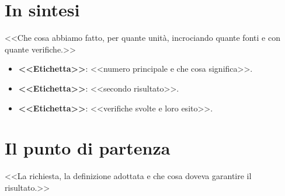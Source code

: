 
\newcommand{\ReportLang}{italian}%
\newcommand{\ReportBrand}{Nomisma}
\newcommand{\ReportProject}{<<PROGETTO>>}%
\newcommand{\ReportTitle}{<<TITOLO: il risultato in una riga, con la scala>>}
\newcommand{\ReportSubtitle}{<<SOTTOTITOLO: Rapporto di sintesi sul lavoro svolto e sui risultati>>}
\newcommand{\ReportAuthor}{<<NOME COGNOME>>}
\newcommand{\ReportRole}{<<RUOLO>>}
\newcommand{\ReportDate}{<<GIORNO MESE ANNO>>}





\maketitleblock

\section{In sintesi}

<<Che cosa abbiamo fatto, per quante unità, incrociando quante fonti e con quante verifiche.>>

\begin{riquadro}
\begin{itemize}
\item \textbf{<<Etichetta>>}: <<numero principale e che cosa significa>>.
\item \textbf{<<Etichetta>>}: <<secondo risultato>>.
\item \textbf{<<Etichetta>>}: <<verifiche svolte e loro esito>>.
\end{itemize}
\end{riquadro}

\tableofcontents

\section{Il punto di partenza}

<<La richiesta, la definizione adottata e che cosa doveva garantire il risultato.>>

